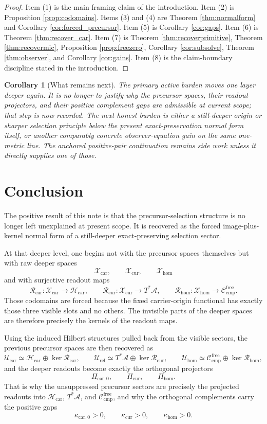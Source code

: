 \documentclass[11pt]{article}
\newcommand{\Sub}{\mathcal A}
\newcommand{\CompFree}{\mathscr C_{\mathrm{cmp}}^{\mathrm{free}}}
\newcommand{\CarrierClass}{\mathscr H_{\mathrm{car}}}
\newcommand{\PreTensorClass}{\mathscr U_{\mathrm{car}}}
\newcommand{\PreRelabelClass}{\mathscr U_{\mathrm{rel}}}
\newcommand{\PreFreeClass}{\mathscr U_{\mathrm{hom}}}
\newcommand{\PreCarProj}{\Pi_{\mathrm{car},0}}
\newcommand{\CurrentProj}{\Pi_{\mathrm{cur}}}
\newcommand{\FreeReadProj}{\Pi_{\mathrm{hom}}}
\newcommand{\PreCarGap}{\kappa_{\mathrm{car},0}}
\newcommand{\CurrentGap}{\kappa_{\mathrm{cur}}}
\newcommand{\HomGap}{\kappa_{\mathrm{hom}}}
\newcommand{\DeepTensorClass}{\mathscr X_{\mathrm{car}}}
\newcommand{\DeepRelabelClass}{\mathscr X_{\mathrm{cur}}}
\newcommand{\DeepFreeClass}{\mathscr X_{\mathrm{hom}}}
\newcommand{\CarRead}{\mathcal R_{\mathrm{car}}}
\newcommand{\CurRead}{\mathcal R_{\mathrm{cur}}}
\newcommand{\HomRead}{\mathcal R_{\mathrm{hom}}}
\newtheorem{corollary}{Corollary}
\begin{document}
\begin{proof}
Item (1) is the main framing claim of the introduction. Item (2) is Proposition \ref{prop:codomains}. Items (3) and (4) are Theorem \ref{thm:normalform} and Corollary \ref{cor:forced_precursor}. Item (5) is Corollary \ref{cor:gaps}. Item (6) is Theorem \ref{thm:recover_car}. Item (7) is Theorem \ref{thm:recoverprimitive}, Theorem \ref{thm:recovermic}, Proposition \ref{prop:freezero}, Corollary \ref{cor:subsolve}, Theorem \ref{thm:observer}, and Corollary \ref{cor:gains}. Item (8) is the claim-boundary discipline stated in the introduction.
\end{proof}

\begin{corollary}[What remains next]
The primary active burden moves one layer deeper again. It is no longer to justify why the precursor spaces, their readout projectors, and their positive complement gaps are admissible at current scope; that step is now recorded. The next honest burden is either a still-deeper origin or sharper selection principle below the present exact-preservation normal form itself, or another comparably concrete observer-equation gain on the same one-metric line. The anchored positive-pair continuation remains side work unless it directly supplies one of those.
\end{corollary}

\section{Conclusion}

The positive result of this note is that the precursor-selection structure is no longer left unexplained at present scope. It is recovered as the forced image-plus-kernel normal form of a still-deeper exact-preserving selection sector.

At that deeper level, one begins not with the precursor spaces themselves but with raw deeper spaces
\[
\DeepTensorClass,\qquad
\DeepRelabelClass,\qquad
\DeepFreeClass
\]
and with surjective readout maps
\[
\CarRead:\DeepTensorClass\to\CarrierClass,
\qquad
\CurRead:\DeepRelabelClass\to T^*\Sub,
\qquad
\HomRead:\DeepFreeClass\to\CompFree.
\]
Those codomains are forced because the fixed carrier-origin functional has exactly those three visible slots and no others. The invisible parts of the deeper spaces are therefore precisely the kernels of the readout maps.

Using the induced Hilbert structures pulled back from the visible sectors, the previous precursor spaces are then recovered as
\[
\PreTensorClass\simeq \CarrierClass\oplus \ker\CarRead,
\qquad
\PreRelabelClass\simeq T^*\Sub\oplus \ker\CurRead,
\qquad
\PreFreeClass\simeq \CompFree\oplus \ker\HomRead,
\]
and the deeper readouts become exactly the orthogonal projectors
\[
\PreCarProj,\qquad
\CurrentProj,\qquad
\FreeReadProj.
\]
That is why the unsuppressed precursor sectors are precisely the projected readouts into \(\CarrierClass\), \(T^*\Sub\), and \(\CompFree\), and why the orthogonal complements carry the positive gaps
\[
\PreCarGap>0,\qquad
\CurrentGap>0,\qquad
\HomGap>0.
\]
\end{document}
